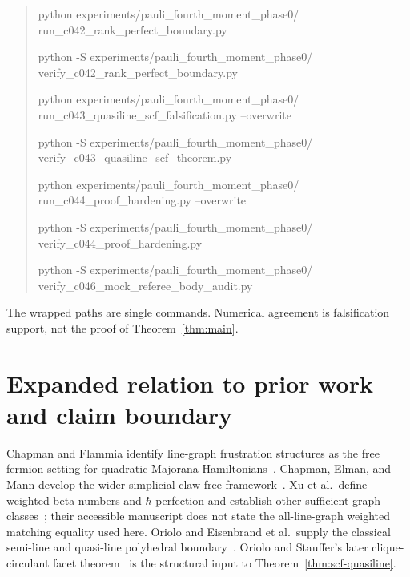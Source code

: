 \documentclass[11pt,a4paper]{article}
\theoremstyle{remark}
\begin{document}
\begin{quote}
\medskip\par
python experiments/pauli\_fourth\_moment\_phase0/\\
\hspace*{1em}run\_c042\_rank\_perfect\_boundary.py\par
python -S experiments/pauli\_fourth\_moment\_phase0/\\
\hspace*{1em}verify\_c042\_rank\_perfect\_boundary.py
\medskip\par
python experiments/pauli\_fourth\_moment\_phase0/\\
\hspace*{1em}run\_c043\_quasiline\_scf\_falsification.py --overwrite\par
python -S experiments/pauli\_fourth\_moment\_phase0/\\
\hspace*{1em}verify\_c043\_quasiline\_scf\_theorem.py
\medskip\par
python experiments/pauli\_fourth\_moment\_phase0/\\
\hspace*{1em}run\_c044\_proof\_hardening.py --overwrite\par
python -S experiments/pauli\_fourth\_moment\_phase0/\\
\hspace*{1em}verify\_c044\_proof\_hardening.py
\medskip\par
python -S experiments/pauli\_fourth\_moment\_phase0/\\
\hspace*{1em}verify\_c046\_mock\_referee\_body\_audit.py
\end{quote}
The wrapped paths are single commands. Numerical agreement is falsification
support, not the proof of Theorem~\ref{thm:main}.

\section{Expanded relation to prior work and claim boundary}

Chapman and Flammia identify line-graph frustration structures as the free
fermion setting for quadratic Majorana Hamiltonians~\cite{cf}. Chapman,
Elman, and Mann develop the wider simplicial claw-free framework~\cite{cem}.
Xu et al.~define weighted beta numbers and $\hbar$-perfection and establish
other sufficient graph classes~\cite{xu}; their accessible manuscript does
not state the all-line-graph weighted matching equality used here. Oriolo and
Eisenbrand et al.~supply the classical semi-line and quasi-line polyhedral
boundary~\cite{oriolo,eosv}. Oriolo and Stauffer's later clique-circulant
facet theorem~\cite{oriolostauffer2022} is the structural input to
Theorem~\ref{thm:scf-quasiline}.
\end{document}

